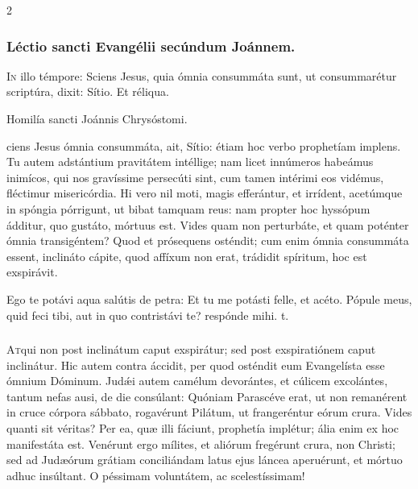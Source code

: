 \documentclass[9pt,twoside]{extarticle}
\begin{document}
\begin{multicols}{2}
\subsubsection*{\center Léctio sancti Evangélii secúndum Joánnem.}
\begin{center}\end{center}
\lettrine{I}n illo témpore: Sciens Jesus, quia ómnia consummáta sunt, ut consummarétur scriptúra, dixit: Sítio. Et réliqua.

\begin{center}Homilía sancti Joánnis Chrysóstomi.\\
\end{center}
ciens Jesus ómnia consummáta, ait, Sítio: étiam hoc verbo prophetíam implens. Tu autem adstántium pravitátem intéllige; nam licet innúmeros habeámus inimícos, qui nos gravíssime persecúti sint, cum tamen intérimi eos vidémus, fléctimur misericórdia. Hi vero nil moti, magis efferántur, et irrídent, acetúmque in spóngia pórrigunt, ut bibat tamquam reus: nam propter hoc hyssópum ádditur, quo gustáto, mórtuus est. Vides quam non perturbáte, et quam poténter ómnia transigéntem? Quod et prósequens osténdit; cum enim ómnia consummáta essent, inclináto cápite, quod affíxum non erat, trádidit spíritum, hoc est exspirávit.

\begin{tightlist}{}
\item {} Ego te potávi aqua salútis de petra: \textred{*} Et tu me potásti felle, et acéto.  Pópule meus, quid feci tibi, aut in quo contristávi te? respónde mihi. t.
\end{tightlist}

\subsubsection*{\center{}}
\lettrine{A}tqui non post inclinátum caput exspirátur; sed post exspiratiónem caput inclinátur. Hic autem contra áccidit, per quod osténdit eum Evangelísta esse ómnium Dóminum. Judǽi autem camélum devorántes, et cúlicem excolántes, tantum nefas ausi, de die consúlant: Quóniam Parascéve erat, ut non remanérent in cruce córpora sábbato, rogavérunt Pilátum, ut frangeréntur eórum crura. Vides quanti sit véritas? Per ea, quæ illi fáciunt, prophetía implétur; ália enim ex hoc manifestáta est. Venérunt ergo mílites, et aliórum fregérunt crura, non Christi; sed ad Judæórum grátiam conciliándam latus ejus láncea aperuérunt, et mórtuo adhuc insúltant. O péssimam voluntátem, ac scelestíssimam!


\end{multicols}
\end{document}
